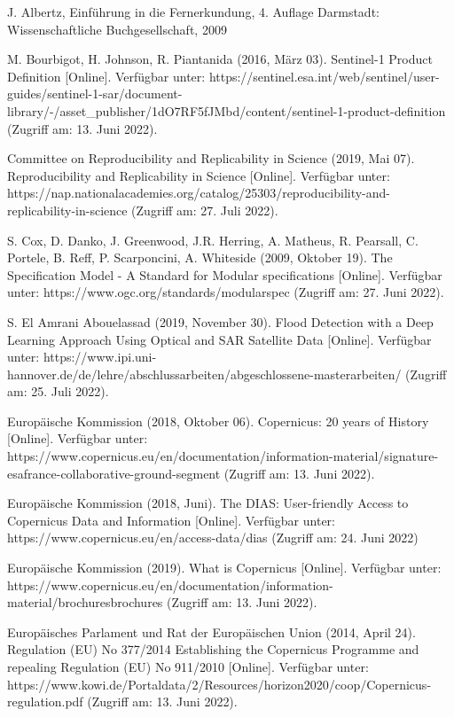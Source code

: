 \newpage
\thispagestyle{empty}
\begin{thebibliography}{1}
J. Albertz, Einführung in die Fernerkundung, 4. Auflage Darmstadt: Wissenschaftliche Buchgesellschaft, 2009
    
M. Bourbigot, H. Johnson, R. Piantanida (2016, März 03). Sentinel-1 Product Definition [Online]. Verfügbar unter: 
https://sentinel.esa.int/web/sentinel/user-guides/sentinel-1-sar/document-library/-/asset\_publisher/1dO7RF5fJMbd/content/sentinel-1-product-definition
(Zugriff am: 13. Juni 2022).

Committee on Reproducibility and Replicability in Science (2019, Mai 07). Reproducibility and Replicability in Science [Online]. Verfügbar unter:
https://nap.nationalacademies.org/catalog/25303/reproducibility-and-replicability-in-science
(Zugriff am: 27. Juli 2022).

S. Cox, D. Danko, J. Greenwood, J.R. Herring, A. Matheus, R. Pearsall, C. Portele, B. Reff, P. Scarponcini, A. Whiteside (2009, Oktober 19). The Specification Model - A Standard for Modular specifications [Online]. Verfügbar unter: 
https://www.ogc.org/standards/modularspec 
(Zugriff am: 27. Juni 2022).

S. El Amrani Abouelassad (2019, November 30). Flood Detection with a Deep Learning Approach Using Optical and SAR Satellite Data [Online]. Verfügbar unter: 
https://www.ipi.uni-hannover.de/de/lehre/abschlussarbeiten/abgeschlossene-masterarbeiten/
(Zugriff am: 25. Juli 2022).

Europäische Kommission (2018, Oktober 06). Copernicus: 20 years of History [Online]. Verfügbar unter: 
https://www.copernicus.eu/en/documentation/information-material/signature-esafrance-collaborative-ground-segment
(Zugriff am: 13. Juni 2022).

Europäische Kommission (2018, Juni). The DIAS: User-friendly Access to Copernicus Data and Information [Online]. Verfügbar unter:
https://www.copernicus.eu/en/access-data/dias
(Zugriff am: 24. Juni 2022)

Europäische Kommission (2019). What is Copernicus [Online]. Verfügbar unter: 
https://www.copernicus.eu/en/documentation/information-material/brochuresbrochures
(Zugriff am: 13. Juni 2022).

Europäisches Parlament und Rat der Europäischen Union (2014, April 24).  Regulation (EU) No 377/2014 Establishing the Copernicus Programme and repealing Regulation (EU) No 911/2010 [Online]. Verfügbar unter: 
https://www.kowi.de/Portaldata/2/Resources/horizon2020/coop/Copernicus-regulation.pdf
(Zugriff am: 13. Juni 2022).


\end{thebibliography}
